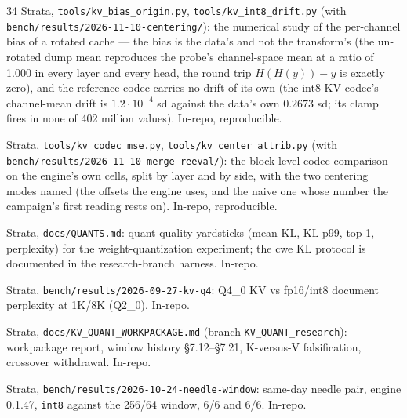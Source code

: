 \documentclass[10pt,twocolumn]{article}
\begin{document}
\begin{thebibliography}{34}
Strata, \texttt{tools/kv\_bias\_origin.py}, \texttt{tools/kv\_int8\_drift.py} (with \texttt{bench/results/2026-11-10-centering/}): the numerical study of the per-channel bias of a rotated cache --- the bias is the data's and not the transform's (the un-rotated dump mean reproduces the probe's channel-space mean at a ratio of 1.000 in every layer and every head, the round trip $H(H(y))-y$ is exactly zero), and the reference codec carries no drift of its own (the int8 KV codec's channel-mean drift is $1.2\cdot10^{-4}$ sd against the data's own $0.2673$ sd; its clamp fires in none of 402 million values). In-repo, reproducible.

Strata, \texttt{tools/kv\_codec\_mse.py}, \texttt{tools/kv\_center\_attrib.py} (with \texttt{bench/results/2026-11-10-merge-reeval/}): the block-level codec comparison on the engine's own cells, split by layer and by side, with the two centering modes named (the offsets the engine uses, and the naive one whose number the campaign's first reading rests on). In-repo, reproducible.

Strata, \texttt{docs/QUANTS.md}: quant-quality yardsticks (mean KL, KL p99, top-1, perplexity) for the weight-quantization experiment; the cwe KL protocol is documented in the research-branch harness. In-repo.

Strata, \texttt{bench/results/2026-09-27-kv-q4}: Q4\_0 KV vs fp16/int8 document perplexity at 1K/8K (Q2\_0). In-repo.

Strata, \texttt{docs/KV\_QUANT\_WORKPACKAGE.md} (branch \texttt{KV\_QUANT\_research}): workpackage report, window history \S7.12--\S7.21, K-versus-V falsification, crossover withdrawal. In-repo.

Strata, \texttt{bench/results/2026-10-24-needle-window}: same-day needle pair, engine 0.1.47, \texttt{int8} against the 256/64 window, 6/6 and 6/6. In-repo.

\end{thebibliography}
\end{document}
